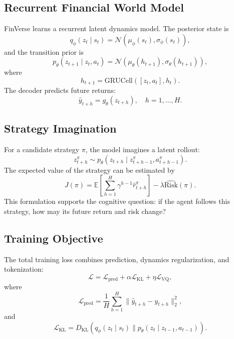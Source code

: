 \documentclass[letterpaper]{article}
\begin{document}
\subsection{Recurrent Financial World Model}
FinVerse learns a recurrent latent dynamics model. The posterior state is
\begin{equation}
    q_\phi(z_t \mid s_t) = \mathcal{N}(\mu_\phi(s_t), \sigma_\phi(s_t)),
\end{equation}
and the transition prior is
\begin{equation}
    p_\theta(z_{t+1} \mid z_t, a_t) =
    \mathcal{N}(\mu_\theta(h_{t+1}), \sigma_\theta(h_{t+1})),
\end{equation}
where
\begin{equation}
    h_{t+1} = \mathrm{GRUCell}([z_t, a_t], h_t).
\end{equation}
The decoder predicts future returns:
\begin{equation}
    \hat{y}_{t+h} = g_\theta(z_{t+h}), \quad h=1,\ldots,H.
\end{equation}

\subsection{Strategy Imagination}
For a candidate strategy $\pi$, the model imagines a latent rollout:
\begin{equation}
    z_{t+h}^{\pi} \sim p_\theta(z_{t+h} \mid z_{t+h-1}^{\pi}, a_{t+h-1}^{\pi}).
\end{equation}
The expected value of the strategy can be estimated by
\begin{equation}
    J(\pi) = \mathbb{E}\left[\sum_{h=1}^{H}\gamma^{h-1}\hat{r}_{t+h}^{\pi}\right]
    - \lambda \widehat{\mathrm{Risk}}(\pi).
\end{equation}
This formulation supports the cognitive question: if the agent follows this strategy, how may its future return and risk change?

\subsection{Training Objective}
The total training loss combines prediction, dynamics regularization, and tokenization:
\begin{equation}
    \mathcal{L} =
    \mathcal{L}_{\mathrm{pred}}
    + \alpha \mathcal{L}_{\mathrm{KL}}
    + \eta \mathcal{L}_{\mathrm{VQ}},
\end{equation}
where
\begin{equation}
    \mathcal{L}_{\mathrm{pred}} =
    \frac{1}{H}\sum_{h=1}^{H}
    \|\hat{y}_{t+h} - y_{t+h}\|_2^2,
\end{equation}
and
\begin{equation}
    \mathcal{L}_{\mathrm{KL}} =
    D_{\mathrm{KL}}(q_\phi(z_t \mid s_t) \| p_\theta(z_t \mid z_{t-1}, a_{t-1})).
\end{equation}
\end{document}
